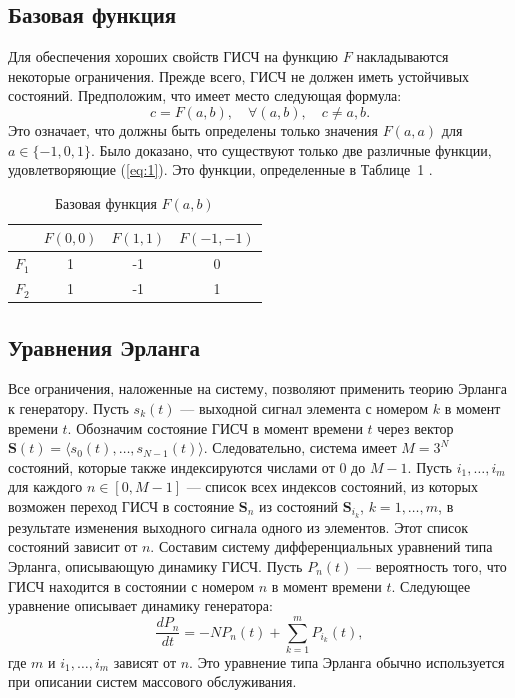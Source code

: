 \documentclass[a4paper,12pt]{article}
\begin{document}
\subsection{Базовая функция}

Для обеспечения хороших свойств ГИСЧ на функцию $F$ накладываются некоторые ограничения. Прежде всего, ГИСЧ не должен иметь устойчивых состояний. Предположим, что имеет место следующая формула:
\begin{equation}
c = F(a,b),\quad \forall (a,b),\quad c\neq a,b.
\label{eq:1}
\end{equation}
Это означает, что должны быть определены только значения $F(a,a)$ для $a\in\{-1,0,1\}$. Было доказано, что существуют только две различные функции, удовлетворяющие (\ref{eq:1}). Это функции, определенные в Таблице~1 \cite{latypov2017}.

\begin{table}[h]
\centering
\caption{Базовая функция $F(a,b)$}
\label{tab:1}
\begin{tabular}{c|c|c|c}
\hline
& $F(0,0)$ & $F(1,1)$ & $F(-1,-1)$ \\ \hline
$F_1$ & 1 & -1 & 0 \\
$F_2$ & 1 & -1 & 1 \\ \hline
\end{tabular}
\end{table}

\subsection{Уравнения Эрланга}

Все ограничения, наложенные на систему, позволяют применить теорию Эрланга \cite{kleinrock1980} к генератору. Пусть $s_k(t)$ --- выходной сигнал элемента с номером $k$ в момент времени $t$. Обозначим состояние ГИСЧ в момент времени $t$ через вектор $\mathbf{S}(t) = \langle s_0(t), \ldots, s_{N-1}(t)\rangle$. Следовательно, система имеет $M = 3^N$ состояний, которые также индексируются числами от $0$ до $M-1$. Пусть $i_1,\ldots,i_m$ для каждого $n\in[0,M-1]$ --- список всех индексов состояний, из которых возможен переход ГИСЧ в состояние $\mathbf{S}_n$ из состояний $\mathbf{S}_{i_k}$, $k=1,\ldots,m$, в результате изменения выходного сигнала одного из элементов. Этот список состояний зависит от $n$. Составим систему дифференциальных уравнений типа Эрланга, описывающую динамику ГИСЧ. Пусть $P_n(t)$ --- вероятность того, что ГИСЧ находится в состоянии с номером $n$ в момент времени $t$. Следующее уравнение описывает динамику генератора:
\begin{equation}
\frac{dP_n}{dt} = -N P_n(t) + \sum_{k=1}^{m} P_{i_k}(t),
\label{eq:2}
\end{equation}
где $m$ и $i_1,\ldots,i_m$ зависят от $n$. Это уравнение типа Эрланга обычно используется при описании систем массового обслуживания.
\end{document}

